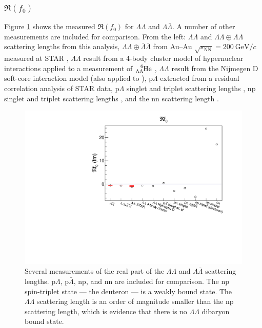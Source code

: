


\subsubsection{$\Re(f_0)$}
\label{sec:Ref0Result}


Figure \ref{fig:Ref0} shows the measured $\Re(f_0)$ for $\Lambda\Lambda$ and $\Lambda\bar{\Lambda}$. A number of other measurements are included for comparison. From the left: $\Lambda\bar{\Lambda}$ and $\Lambda\Lambda \oplus \bar{\Lambda}\bar{\Lambda}$ scattering lengths from this analysis, $\Lambda\Lambda \oplus \bar{\Lambda}\bar{\Lambda}$ from Au--Au $\sqrt{s_{\mathrm{NN}}} = 200\ \mathrm{GeV}/c$ measured at STAR \cite{Adamczyk:2014vca}, $\Lambda\Lambda$ result from a 4-body cluster model of hypernuclear interactions \cite{Hiyama:2002yj} applied to a measurement of $\ce{^{6}_{\Lambda\Lambda}\mathrm{He}}$ \cite{Takahashi:2001nm}, $\Lambda\Lambda$ result from the Nijmegen D soft-core interaction model \cite{Filikhin:2002wm} (also applied to \cite{Hiyama:2002yj}), $\mathrm{p}\bar{\Lambda}$ extracted from a residual correlation analysis \cite{Kisiel:2014mma} of STAR data, $\mathrm{p}\Lambda$ singlet and triplet scattering lengths \cite{Wang:1999bf}, np singlet and triplet scattering lengths \cite{LANDAU1977502}, and the nn scattering length \cite{vonWitsch:1979uni}.

\begin{figure}[hbtp]
\includegraphics[width=36pc]{Figures/FitResults/2016-9-14-Ref0.pdf}
\caption[Measurements of $\Re(f_0)$ for various particle pairs]{Several measurements of the real part of the $\Lambda\Lambda$ and $\Lambda\bar{\Lambda}$ scattering lengths. p$\Lambda$, p$\bar{\Lambda}$, np, and nn are included for comparison. The np spin-triplet state --- the deuteron --- is a weakly bound state. The $\Lambda\Lambda$ scattering length is an order of magnitude smaller than the np scattering length, which is evidence that there is no $\Lambda\Lambda$ dibaryon bound state.}
\label{fig:Ref0}
\end{figure}

